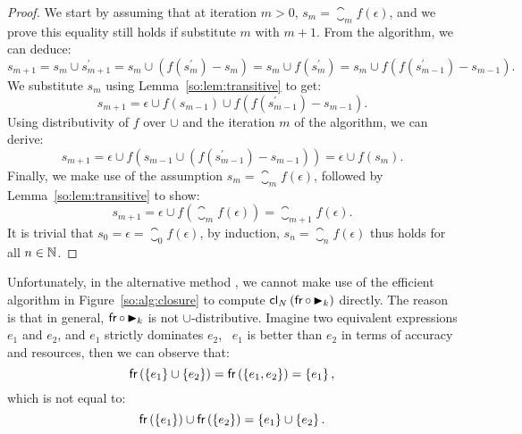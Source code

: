 \begin{proof}
    We start by assuming that at iteration $m > 0$, $s_m = \closure_m
    f(\epsilon)$, and we prove this equality still holds if substitute $m$ with
    $m + 1$.  From the algorithm, we can deduce:
    \begin{equation*}
        s_{m+1}
        = s_m \cup s^\prime_{m+1}
        = s_m \cup \left( f \left( s^\prime_m \right) - s_m \right)
        = s_m \cup f \left( s^\prime_m \right)
        = s_m \cup f \left(
            f \left( s^\prime_{m-1} \right) - s_{m-1}
        \right).
    \end{equation*}
    We substitute $s_m$ using Lemma~\ref{so:lem:transitive} to get:
    \begin{equation*}
        s_{m+1}
        = \epsilon \cup f \left( s_{m-1} \right) \cup
        f \left(
            f \left( s^\prime_{m-1} \right) - s_{m-1}
        \right).
    \end{equation*}
    Using distributivity of $f$ over $\cup$ and the iteration $m$ of the
    algorithm, we can derive:
    \begin{equation*}
        s_{m+1}
        = \epsilon \cup f \left(
            s_{m-1} \cup \left(
                f \left( s^\prime_{m-1} \right) - s_{m-1}
            \right)
        \right)
        = \epsilon \cup f \left( s_m \right).
    \end{equation*}
    Finally, we make use of the assumption $s_m = \closure_m f(\epsilon)$,
    followed by Lemma~\ref{so:lem:transitive} to show:
    \begin{equation*}
        s_{m+1}
        = \epsilon \cup f \left(
            \closure_m f(\epsilon)
        \right)
        = \closure_{m+1} f(\epsilon).
    \end{equation*}
    It is trivial that $s_0 = \epsilon = \closure_0 f(\epsilon)$, by induction,
    $s_n = \closure_n f(\epsilon)$ thus holds for all $n \in \mathbb{N}$.
\end{proof}

Unfortunately, in the alternative method \greedytrace{}, we cannot make use of
the efficient algorithm in Figure~\ref{so:alg:closure} to compute $\operatorname{\mathsf{cl}}_N
\left( \operatorname{\mathsf{fr}} \circ \operatorname{\blacktriangleright}_k \right)$ directly.  The reason is that in
general, $\operatorname{\mathsf{fr}} \circ \operatorname{\blacktriangleright}_k$ is not $\cup$-distributive.  Imagine two
equivalent expressions $e_1$ and $e_2$, and $e_1$ strictly dominates $e_2$,
\ie~$e_1$ is better than $e_2$ in terms of accuracy and resources, then we can
observe that:
\begin{equation}
    \operatorname{\mathsf{fr}} \left( \left\{ e_1 \right\} \cup \left\{ e_2 \right\} \right)
    = \operatorname{\mathsf{fr}} \left( \left\{ e_1, e_2 \right\} \right)
    = \left\{ e_1 \right\},
\end{equation}
which is not equal to:
\begin{equation}
    \operatorname{\mathsf{fr}} \left( \left\{ e_1 \right\} \right) \cup
    \operatorname{\mathsf{fr}} \left( \left\{ e_2 \right\} \right)
    = \left\{ e_1 \right\} \cup \left\{ e_2 \right\}.
\end{equation}

